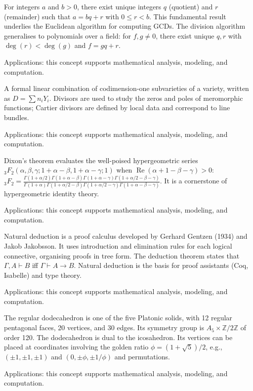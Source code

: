 For integers $a$ and $b > 0$, there exist unique integers $q$ (quotient) and $r$ (remainder) such that $a = bq + r$ with $0 \leq r < b$. This fundamental result underlies the Euclidean algorithm for computing GCDs. The division algorithm generalises to polynomials over a field: for $f, g \neq 0$, there exist unique $q, r$ with $\deg(r) < \deg(g)$ and $f = gq + r$. \par\noindent Applications: this concept supports mathematical analysis, modeling, and computation.

A formal linear combination of codimension-one subvarieties of a variety, written as $D = \sum n_i Y_i$. Divisors are used to study the zeros and poles of meromorphic functions; Cartier divisors are defined by local data and correspond to line bundles. \par\noindent Applications: this concept supports mathematical analysis, modeling, and computation.

Dixon's theorem evaluates the well-poised hypergeometric series $_3F_2(\alpha, \beta, \gamma; 1+\alpha-\beta, 1+\alpha-\gamma; 1)$ when $\operatorname{Re}(\alpha + 1 - \beta - \gamma) > 0$: $_3F_2 = \frac{\Gamma(1+\alpha/2)\Gamma(1+\alpha-\beta)\Gamma(1+\alpha-\gamma)\Gamma(1+\alpha/2-\beta-\gamma)}{\Gamma(1+\alpha)\Gamma(1+\alpha/2-\beta)\Gamma(1+\alpha/2-\gamma)\Gamma(1+\alpha-\beta-\gamma)}$. It is a cornerstone of hypergeometric identity theory. \par\noindent Applications: this concept supports mathematical analysis, modeling, and computation.

Natural deduction is a proof calculus developed by Gerhard Gentzen (1934) and Jakob Jakobsson. It uses introduction and elimination rules for each logical connective, organising proofs in tree form. The deduction theorem states that $\Gamma, A \vdash B$ iff $\Gamma \vdash A \to B$. Natural deduction is the basis for proof assistants (Coq, Isabelle) and type theory. \par\noindent Applications: this concept supports mathematical analysis, modeling, and computation.

The regular dodecahedron is one of the five Platonic solids, with 12 regular pentagonal faces, 20 vertices, and 30 edges. Its symmetry group is $A_5 \times \mathbb{Z}/2\mathbb{Z}$ of order 120. The dodecahedron is dual to the icosahedron. Its vertices can be placed at coordinates involving the golden ratio $\phi = (1+\sqrt{5})/2$, e.g., $(\pm 1, \pm 1, \pm 1)$ and $(0, \pm \phi, \pm 1/\phi)$ and permutations. \par\noindent Applications: this concept supports mathematical analysis, modeling, and computation.

